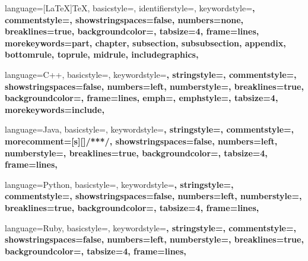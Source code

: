 \makeatletter
{}
\makeatother
\setlength{\parindent}{1.3cm}
\setlength{\parskip}{0.2cm}
\makeindex

 {
  language={[LaTeX]TeX},
  basicstyle=\ttfamily\small,
  identifierstyle=\color{black},
  keywordstyle=\color{blue}\bfseries,
  commentstyle=\color{comentary},
  showstringspaces=false,
  numbers=none,
  breaklines=true,
  backgroundcolor=\color{white},
  tabsize=4,
  frame=lines,
  morekeywords={part, chapter, subsection, subsubsection, appendix, bottomrule, toprule, midrule, includegraphics},
}

 {
  language=C++,
  basicstyle=\ttfamily\small,
  keywordstyle=\color{blue}\bfseries,
  stringstyle=\color{string},
  commentstyle=\color{comentary},
  showstringspaces=false,
  numbers=left,
  numberstyle=\tiny,
  breaklines=true,
  backgroundcolor=\color{white},
  frame=lines,
  emph={},
  emphstyle={\color{blue}\bfseries},
  tabsize=4,
  morekeywords={include},
}

 {
  language=Java,
  basicstyle=\ttfamily\small,
  keywordstyle=\color{blue}\bfseries,
  stringstyle=\color{string},
  commentstyle=\color{comentary},
  morecomment=[s][\color{blue}]{/**}{*/},
  showstringspaces=false,
  numbers=left,
  numberstyle=\tiny,
  breaklines=true,
  backgroundcolor=\color{white},
  tabsize=4,
  frame=lines,
}

 {
  language=Python,
  basicstyle=\ttfamily\small,
  keywordstyle=\color{blue}\bfseries,
  stringstyle=\color{string},
  commentstyle=\color{comentary},
  showstringspaces=false,
  numbers=left,
  numberstyle=\tiny,
  breaklines=true,
  backgroundcolor=\color{white},
  tabsize=4,
  frame=lines,
}

 {
  language=Ruby,
  basicstyle=\ttfamily\small,
  keywordstyle=\color{blue}\bfseries,
  stringstyle=\color{string},
  commentstyle=\color{comentary},
  showstringspaces=false,
  numbers=left,
  numberstyle=\tiny,
  breaklines=true,
  backgroundcolor=\color{white},
  tabsize=4,
  frame=lines,
}

